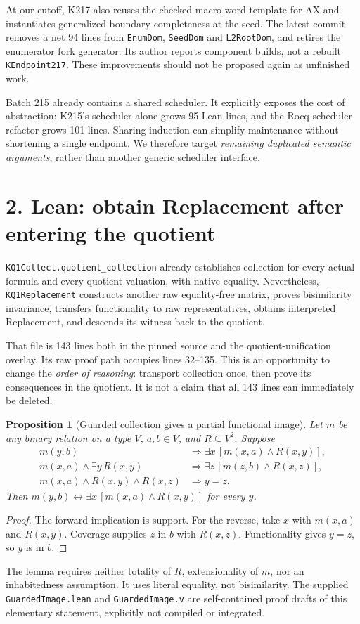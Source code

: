 \documentclass[10pt]{article}
\newcommand{\code}[1]{\texttt{#1}}
\newtheorem{proposition}{Proposition}
\begin{document}
At our cutoff, K217 also reuses the checked macro-word template for AX and instantiates generalized boundary completeness at the seed. The latest commit removes a net 94 lines from \code{EnumDom}, \code{SeedDom} and \code{L2RootDom}, and retires the enumerator fork generator. Its author reports component builds, not a rebuilt \code{KEndpoint217}. These improvements should not be proposed again as unfinished work.

Batch 215 already contains a shared scheduler. It explicitly exposes the cost of abstraction: K215's scheduler alone grows 95 Lean lines, and the Rocq scheduler refactor grows 101 lines. Sharing induction can simplify maintenance without shortening a single endpoint. We therefore target \emph{remaining duplicated semantic arguments}, rather than another generic scheduler interface.
\newpage
\section*{2. Lean: obtain Replacement after entering the quotient}
\code{KQ1Collect.quotient\_collection} already establishes collection for every actual formula and every quotient valuation, with native equality. Nevertheless, \code{KQ1Replacement} constructs another raw equality-free matrix, proves bisimilarity invariance, transfers functionality to raw representatives, obtains interpreted Replacement, and descends its witness back to the quotient.

That file is 143 lines both in the pinned source and the quotient-unification overlay. Its raw proof path occupies lines 32--135. This is an opportunity to change the \emph{order of reasoning}: transport collection once, then prove its consequences in the quotient. It is not a claim that all 143 lines can immediately be deleted.

\begin{proposition}[Guarded collection gives a partial functional image]
Let $m$ be any binary relation on a type $V$, $a,b\in V$, and $R\subseteq V^2$.
Suppose
\begin{align*}
 m(y,b)&\Longrightarrow \exists x\,[m(x,a)\land R(x,y)],\\
 m(x,a)\land\exists y\,R(x,y)&\Longrightarrow
                 \exists z\,[m(z,b)\land R(x,z)],\\
 m(x,a)\land R(x,y)\land R(x,z)&\Longrightarrow y=z.
\end{align*}
Then $m(y,b)\leftrightarrow\exists x\,[m(x,a)\land R(x,y)]$ for every $y$.
\end{proposition}
\begin{proof}
The forward implication is support. For the reverse, take $x$ with $m(x,a)$ and $R(x,y)$. Coverage supplies $z$ in $b$ with $R(x,z)$. Functionality gives $y=z$, so $y$ is in $b$.
\end{proof}
The lemma requires neither totality of $R$, extensionality of $m$, nor an inhabitedness assumption. It uses literal equality, not bisimilarity. The supplied \code{GuardedImage.lean} and \code{GuardedImage.v} are self-contained proof drafts of this elementary statement, explicitly not compiled or integrated.
\end{document}
